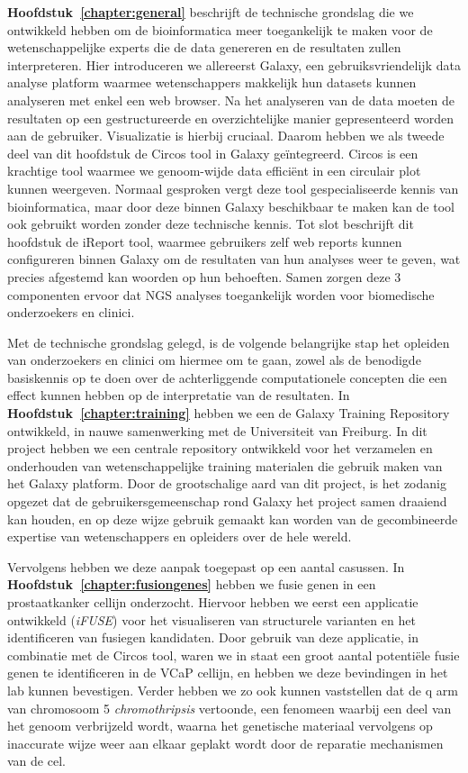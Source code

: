 \textbf{Hoofdstuk~\ref{chapter:general}} beschrijft de technische grondslag die we ontwikkeld hebben om de bioinformatica meer toegankelijk te maken voor de wetenschappelijke experts die de data genereren en de resultaten zullen interpreteren.
Hier introduceren we allereerst Galaxy, een gebruiksvriendelijk data analyse platform waarmee wetenschappers makkelijk hun datasets kunnen analyseren met enkel een web browser. Na het analyseren van de data moeten de resultaten op een gestructureerde en overzichtelijke manier gepresenteerd worden aan de gebruiker. Visualizatie is hierbij cruciaal.
Daarom hebben we als tweede deel van dit hoofdstuk de Circos tool in Galaxy geïntegreerd. Circos is een krachtige tool waarmee we genoom-wijde data efficiënt in een circulair plot kunnen weergeven.
Normaal gesproken vergt deze tool gespecialiseerde kennis van bioinformatica, maar door deze binnen Galaxy beschikbaar te maken kan de tool ook gebruikt worden zonder deze technische kennis.
Tot slot beschrijft dit hoofdstuk de iReport tool, waarmee gebruikers zelf web reports kunnen configureren binnen Galaxy om de resultaten van hun analyses weer te geven, wat precies afgestemd kan woorden op hun behoeften.
Samen zorgen deze 3 componenten ervoor dat NGS analyses toegankelijk worden voor biomedische onderzoekers en clinici.

Met de technische grondslag gelegd, is de volgende belangrijke stap het opleiden van onderzoekers
en clinici om hiermee om te gaan, zowel als de benodigde basiskennis op te doen over de achterliggende computationele concepten die een effect kunnen hebben op de interpretatie van de resultaten.
In \textbf{Hoofdstuk~\ref{chapter:training}} hebben we een de Galaxy Training Repository ontwikkeld, in nauwe samenwerking met de Universiteit van Freiburg.
In dit project hebben we een centrale repository ontwikkeld voor het verzamelen en onderhouden van wetenschappelijke training materialen die gebruik maken van het Galaxy platform.
Door de grootschalige aard van dit project, is het zodanig opgezet dat de gebruikersgemeenschap rond Galaxy het project samen draaiend kan houden, en op deze wijze gebruik gemaakt kan worden van de gecombineerde expertise van wetenschappers en opleiders over de hele wereld.

Vervolgens hebben we deze aanpak toegepast op een aantal casussen. In \textbf{Hoofdstuk~\ref{chapter:fusiongenes}} hebben we fusie genen in een prostaatkanker cellijn onderzocht. Hiervoor hebben we eerst een applicatie ontwikkeld (\emph{iFUSE}) voor het visualiseren van structurele varianten en het identificeren van fusiegen kandidaten.
Door gebruik van deze applicatie, in combinatie met de Circos tool, waren we in staat een groot aantal potentiële fusie genen te identificeren in de VCaP cellijn, en hebben we deze bevindingen in het lab kunnen bevestigen.
Verder hebben we zo ook kunnen vaststellen dat de q arm van chromosoom 5 \emph{chromothripsis} vertoonde, een fenomeen waarbij een deel van het genoom verbrijzeld wordt, waarna het genetische materiaal vervolgens op inaccurate wijze weer aan elkaar geplakt wordt door de reparatie mechanismen van de cel.

